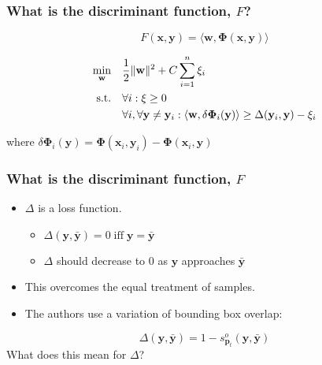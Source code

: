 \begin{frame}
    \frametitle{What is the discriminant function, \(F\)?}
    \begin{equation}
        F(\mathbf{x}, \mathbf{y}) = \langle \mathbf{w}, \mathbf{\Phi}(\mathbf{x}, \mathbf{y})\rangle
    \end{equation}

    \begin{equation} \label{eq:minimizing_hyperplane}
        \begin{aligned}
            \min_{\mathbf{w}} \quad & \frac{1}{2} \|\mathbf{w}\|^2 + C \sum_{i=1}^n \xi_i \\
            \operatorname{\text{s.t.} \quad} & \forall i : \xi \ge 0 \\
                & \forall i, \forall \mathbf{y} \ne \mathbf{y}_i : \langle \mathbf{w}, \delta \mathbf{\Phi}_i (\mathbf{y}) \rangle \ge \Delta (\mathbf{y}_i, \mathbf{y}) - \xi_i
        \end{aligned}
    \end{equation}

    where \( \delta \mathbf{\Phi}_i (\mathbf{y}) = \mathbf{\Phi}(\mathbf{x}_i, \mathbf{y}_i) - \mathbf{\Phi}(\mathbf{x}_i, \mathbf{y}) \)
\end{frame}

\begin{frame}
    \frametitle{What is the discriminant function, \(F\)}
    \begin{itemize}
        \item \(\Delta\) is a loss function.
            \begin{itemize}
                \item \(\Delta (\mathbf{y}, \mathbf{\bar{y}}) = 0 \; \text{iff} \; \mathbf{y} = \mathbf{\bar{y}}\)
                \item \(\Delta\) should decrease to 0 as \(\mathbf{y}\) approaches \(\mathbf{\bar{y}}\)
            \end{itemize}
        \item This overcomes the equal treatment of samples.
        \item The authors use a variation of bounding box overlap:
    \end{itemize}
    \begin{equation}
        \Delta(\mathbf{y}, \mathbf{\bar{y}}) = 1 - s_{\mathbf{p}_t}^o (\mathbf{y}, \mathbf{\bar{y}})
    \end{equation}
    \alert{What does this mean for \(\Delta\)?}
\end{frame}

